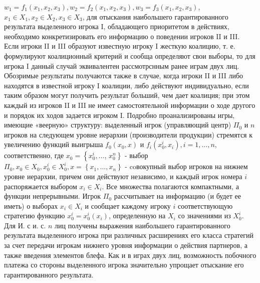 \documentclass[10pt]{article}
\begin{document}
$w_{1}=f_{1}\left(x_{1}, x_{2}, x_{3}\right), w_{2}=f_{2}\left(x_{1}, x_{2}, x_{3}\right), w_{3}=f_{3}\left(x_{1}, x_{2}, x_{3}\right)$, $x_{1} \in X_{1}, x_{2} \in X_{2}, x_{3} \in X_{3}$, для отыскания наибольшего гарантированного результата выделенного игрока I, обладающего приоритетом в действиях, необходимо конкретизировать его информацию о поведении игроков II и III. Если игроки II и III образуют известную игроку I жесткую коалицию, т. е. формулируют коалиционный критерий и сообща определяют свои выборы, то для игрока I данный случай эквивалентен рассмотрснным ранее играм двух лиц. Обозримые результаты получаются также в случае, когда игроки II и III либо находятся в известной игроку I коалиции, либо действуют индивидуально, если таким образом могут получить результат больший, чем дает коалиция; при этом каждый из игроков II и III не имеет самостоятельной информации о ходе другого и порядок их ходов задается игроком I. Подробно проанализированы игры, имеющие «веерную» структуру: выделенный игрок (управляющий центр) $\Pi_{0}$ и $n$ игроков на следующем уровне иерархии (производители продукции) стремятся к увеличению функций выигрыша $f_{0}\left(x_{0}, x\right)$ и $f_{i}\left(x_{0}^{i}, x_{i}\right), i=1, \ldots, n$, соответственно, где $x_{0}=\left\{x_{0}^{i}, \ldots\right.$, $\left.x_{0}^{n}\right\}$ - выбор $\Pi_{0}, x_{0} \in X_{0}, x_{0}^{i} \in X_{0}^{i}, x=\left\{x_{1}, \ldots, x_{n}\right\}$ - coвокупный выбор игроков на нижнем уровне иерархии, причем они действуют независимо, и каждый игрок номера $i$ распоряжается выбором $x_{i} \in X_{i}$. Все множества полагаются компактными, а функции непрерывными. Игрок $\Pi_{0}$ рассчитывает на информацию (и будет ее иметь) о выборах $x_{i} \in X_{i}$ и сообщает каждому игроку $i$ соответствующую стратегию функцию $x_{0}^{i}=x_{0}^{i}\left(x_{i}\right)$, определенную на $X_{i}$ со значениями из $X_{0}^{i}$. Для И. с и. с. $n$ лиц получены выражения наибольшего гарантированного результата выделенного игрока при различных расширениях его класса стратегий за счет передачи игрокам нижнего уровня информации о действия партнеров, а также введения элементов блефа. Как и в играх двух лиц, возможность побочного платежа со стороны выделенного игрока значительно упрощает отыскание его гарантированного результата.
\end{document}
